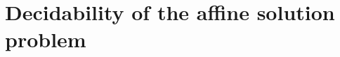 \documentclass[acmsmall]{acmart}
\theoremstyle{plain}
\theoremstyle{definition}
\newcommand{\mybar}[1]{\overline{#1}}
\newcommand{\Nat}{\mathbb{N}}
\newcommand{\Int}{\mathbb{Z}}
\newcommand{\sop}{[} %
\newcommand{\scl}{]} %
\newcommand{\sel}[2]{#1 \backslash #2} %
\newcommand{\unsubst}[2]{\sop \sel{#1}{#2} \scl} %
\newcommand{\modelsa}{\models_\mathrm{a}} %
\begin{document}

\section{Decidability of the affine solution problem}\label{sectionAffineSolutionProblem}
\end{document}

